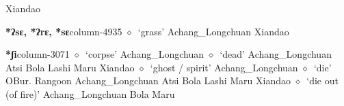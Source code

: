          Xiandao 
  \item {\footnotesize \textbf{*ʔsɛ, *ʔrɛ, *sɛ}}{\tiny column-4935}
         $\diamond$~`grass'
         Achang\_Longchuan 
\hspace{1ex}
         Xiandao 
  \item {\footnotesize \textbf{*ʃi}}{\tiny column-3071}
         $\diamond$~`corpse'
         Achang\_Longchuan 
\hspace{1ex}
         $\diamond$~`dead'
         Achang\_Longchuan 
\hspace{1ex}
         Atsi 
\hspace{1ex}
         Bola 
\hspace{1ex}
         Lashi 
\hspace{1ex}
         Maru 
\hspace{1ex}
         Xiandao 
\hspace{1ex}
         $\diamond$~`ghost / spirit'
         Achang\_Longchuan 
\hspace{1ex}
         $\diamond$~`die'
         OBur. 
\hspace{1ex}
         Rangoon 
\hspace{1ex}
         Achang\_Longchuan 
\hspace{1ex}
         Atsi 
\hspace{1ex}
         Bola 
\hspace{1ex}
         Lashi 
\hspace{1ex}
         Maru 
\hspace{1ex}
         Xiandao 
\hspace{1ex}
         $\diamond$~`die out (of fire)'
         Achang\_Longchuan 
\hspace{1ex}
         Bola 
\hspace{1ex}
         Maru 
\hspace{1ex}
